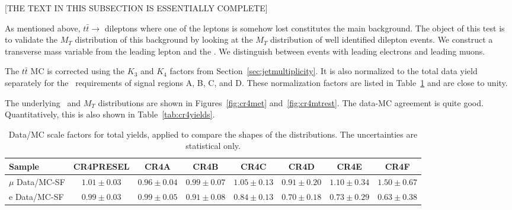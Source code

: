[THE TEXT IN THIS SUBSECTION IS ESSENTIALLY COMPLETE]

As mentioned above, $t\bar{t} \to $ dileptons where one of the leptons
is somehow lost constitutes the main background.
The object of this test is to validate the $M_T$ distribution of this
background by looking at the $M_T$ distribution of well identified
dilepton events.
We construct a transverse mass variable from the leading lepton and
the \met.  We distinguish between events with leading electrons and
leading muons.  

The $t\bar{t}$ MC is corrected using the $K_3$ and $K_4$ factors
from Section~\ref{sec:jetmultiplicity}.  It is also normalized to the 
total data yield separately for the \met\ requirements of signal
regions A, B, C, and D.  These normalization factors are listed
in Table~\ref{tab:cr4mtsf} and are close to unity.

The underlying \met\ and $M_T$ distributions are shown in 
Figures~\ref{fig:cr4met} and~\ref{fig:cr4mtrest}.  The data-MC agreement
is quite good.  Quantitatively, this is also shown in Table~\ref{tab:cr4yields}.


\begin{table}[!h]
\begin{center}
{\footnotesize
\begin{tabular}{l||c||c|c|c|c|c|c}
\hline
Sample              & CR4PRESEL & CR4A & CR4B & CR4C &
CR4D & CR4E & CR4F\\
\hline
\hline
$\mu$ Data/MC-SF 	  & $1.01 \pm 0.03$ & $0.96 \pm 0.04$ & $0.99 \pm 0.07$ & $1.05 \pm 0.13$ & $0.91 \pm 0.20$ & $1.10 \pm 0.34$ & $1.50 \pm 0.67$ \\
\hline
\hline
e Data/MC-SF 	  & $0.99 \pm 0.03$ & $0.99 \pm 0.05$ & $0.91 \pm 0.08$ & $0.84 \pm 0.13$ & $0.70 \pm 0.18$ & $0.73 \pm 0.29$ & $0.63 \pm 0.38$ \\
\hline
\end{tabular}}
\caption{ Data/MC scale factors for total yields, applied to compare
  the shapes of the distributions.
  The uncertainties are statistical only.
\label{tab:cr4mtsf}}
\end{center}
\end{table}


